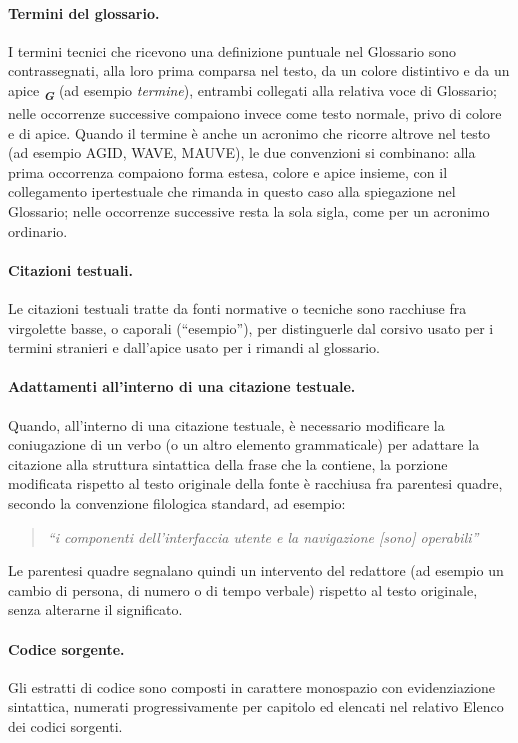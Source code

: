 \paragraph*{Termini del glossario.} I termini tecnici che ricevono una definizione puntuale nel Glossario sono contrassegnati, alla loro prima comparsa nel testo, da un colore distintivo e da un apice \textsubscript{\textbf{\textit{G}}} (ad esempio \emph{termine}\glox), entrambi collegati alla relativa voce di Glossario; nelle occorrenze successive compaiono invece come testo normale, privo di colore e di apice. Quando il termine è anche un acronimo che ricorre altrove nel testo (ad esempio AGID, WAVE, MAUVE), le due convenzioni si combinano: alla prima occorrenza compaiono forma estesa, colore e apice insieme, con il collegamento ipertestuale che rimanda in questo caso alla spiegazione nel Glossario; nelle occorrenze successive resta la sola sigla, come per un acronimo ordinario.

\paragraph*{Citazioni testuali.} Le citazioni testuali tratte da fonti normative o tecniche sono racchiuse fra virgolette basse, o caporali (\enquote{esempio}), per distinguerle dal corsivo usato per i termini stranieri e dall'apice usato per i rimandi al glossario.

\paragraph*{Adattamenti all'interno di una citazione testuale.} Quando, all'interno di una citazione testuale, è necessario modificare la coniugazione di un verbo (o un altro elemento grammaticale) per adattare la citazione alla struttura sintattica della frase che la contiene, la porzione modificata rispetto al testo originale della fonte è racchiusa fra parentesi quadre, secondo la convenzione filologica standard, ad esempio:
\begin{quote}
\itshape \enquote{i componenti dell'interfaccia utente e la navigazione [sono] operabili}
\end{quote}
Le parentesi quadre segnalano quindi un intervento del redattore (ad esempio un cambio di persona, di numero o di tempo verbale) rispetto al testo originale, senza alterarne il significato.

\paragraph*{Codice sorgente.} Gli estratti di codice sono composti in carattere monospazio con evidenziazione sintattica, numerati progressivamente per capitolo ed elencati nel relativo Elenco dei codici sorgenti.
\endgroup